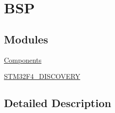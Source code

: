 \hypertarget{group__BSP}{\section{B\-S\-P}
\label{group__BSP}
}
\subsection*{Modules}
\begin{DoxyCompactItemize}
\item 
\hyperlink{group__Components}{Components}
\item 
\hyperlink{group__STM32F4__DISCOVERY}{S\-T\-M32\-F4\-\_\-\-D\-I\-S\-C\-O\-V\-E\-R\-Y}
\end{DoxyCompactItemize}


\subsection{Detailed Description}
